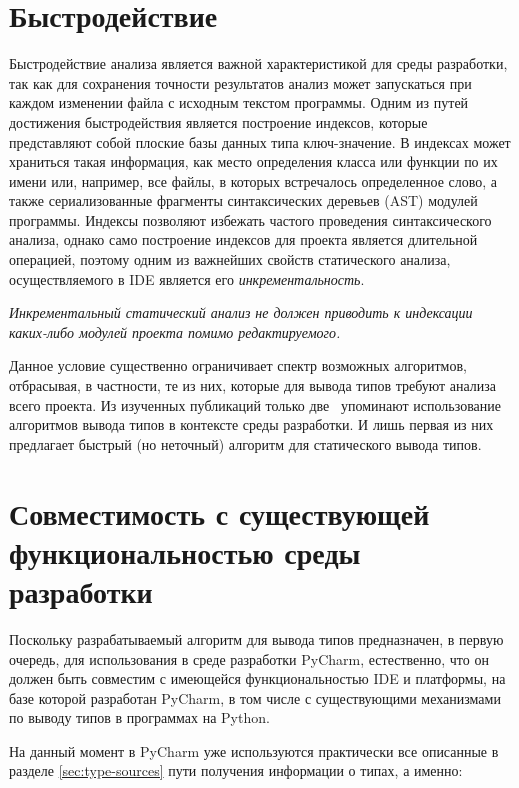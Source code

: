 \section{Быстродействие}
\label{sec:performance-requirement}

Быстродействие анализа является важной характеристикой для среды разработки, так
как для сохранения точности результатов анализ может запускаться
при каждом изменении файла с исходным текстом программы. Одним из путей
достижения быстродействия является построение индексов, которые представляют
собой плоские базы данных типа ключ-значение. В индексах может храниться такая
информация, как место определения класса или функции по их имени или,
например, все файлы, в которых встречалось определенное слово, а также
сериализованные фрагменты синтаксических деревьев (AST) модулей программы. Индексы
позволяют избежать частого проведения синтаксического анализа, однако само
построение индексов для проекта является длительной операцией, поэтому одним из
важнейших свойств статического анализа, осуществляемого в IDE является его
\emph{инкрементальность}.


\emph{Инкрементальный статический анализ не должен приводить к индексации 
 каких-либо модулей проекта помимо редактируемого.}

Данное условие существенно ограничивает спектр возможных алгоритмов, отбрасывая,
в частности, те из них, которые для вывода типов требуют анализа всего проекта. Из
 изученных публикаций только две~\cite{Pluquet2009,Haupt2011} упоминают
использование алгоритмов вывода типов в контексте среды разработки. И лишь
первая из них предлагает быстрый (но неточный) алгоритм для статического вывода типов.

\section{Совместимость с существующей функциональностью среды разработки}
\label{sec:compatibility-requirement}

Поскольку разрабатываемый алгоритм для вывода типов предназначен, в первую
очередь, для использования в среде разработки PyCharm, естественно, что он должен
быть совместим с имеющейся функциональностью IDE и платформы, на базе которой
разработан PyCharm, в том числе с существующими механизмами по выводу типов в
программах на Python. 

На данный момент в PyCharm уже используются практически все описанные в разделе
\ref{sec:type-sources} пути получения информации о типах, а именно:

